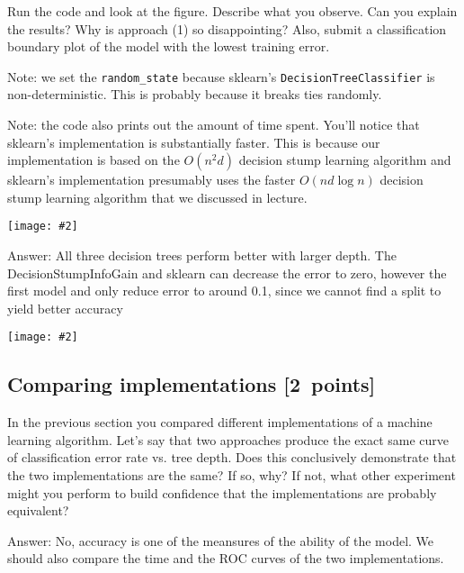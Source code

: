 \documentclass{article}
\newcommand{\blu}[1]{{\textcolor{blu}{#1}}}
\newcommand{\gre}[1]{\textcolor{gre}{#1}}
\newcommand\ans[1]{\par\gre{Answer: #1}}
\let\ask\blu
\newcommand\pts[1]{\textcolor{pointscolour}{[#1~points]}}
\newcommand{\centerfig}[2]{\begin{center}\texttt{[image: \#2]}\end{center}}
\begin{document}
  Run the code and look at the figure.
  \ask{Describe what you observe. Can you explain the results?} Why is approach (1) so disappointing? Also, \ask{submit a classification boundary plot of the model with the lowest training error}.

  Note: we set the \verb|random_state| because sklearn's \texttt{DecisionTreeClassifier} is non-deterministic. This is probably
  because it breaks ties randomly.

  Note: the code also prints out the amount of time spent. You'll notice that sklearn's implementation is substantially faster. This is because
  our implementation is based on the $O(n^2d)$ decision stump learning algorithm and sklearn's implementation presumably uses the faster $O(nd\log n)$
  decision stump learning algorithm that we discussed in lecture.

  \centerfig{0.7}{./figs/q6_5_tree_errors}
  \ans{All three decision trees perform better with larger depth. The DecisionStumpInfoGain and sklearn can decrease the error to zero, however the first model and only reduce error to around 0.1, since we cannot find a split to yield better accuracy}
  
  \centerfig{0.7}{./figs/q6_5_decisionBoundary}

  \subsection{Comparing implementations \pts{2}}

  In the previous section you compared different implementations of a machine learning algorithm. Let's say that two
  approaches produce the exact same curve of classification error rate vs. tree depth. Does this conclusively demonstrate
  that the two implementations are the same? If so, why? If not, what other experiment might you perform to build confidence
  that the implementations are probably equivalent?

  \ans{No, accuracy is one of the meansures of the ability of the model. We should also compare the time and the ROC curves of the two implementations.}
\end{document}
